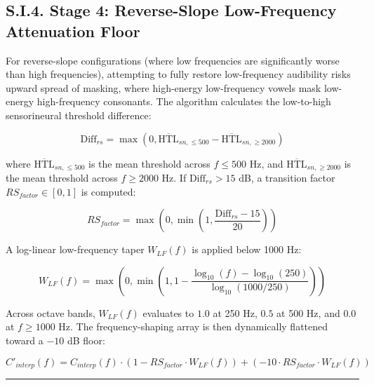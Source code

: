 \documentclass[
  12pt,
]{article}
\begin{document}
\subsection{S.I.4. Stage 4: Reverse-Slope Low-Frequency Attenuation
Floor}\label{s.i.4.-stage-4-reverse-slope-low-frequency-attenuation-floor}

For reverse-slope configurations (where low frequencies are
significantly worse than high frequencies), attempting to fully restore
low-frequency audibility risks upward spread of masking, where
high-energy low-frequency vowels mask low-energy high-frequency
consonants. The algorithm calculates the low-to-high sensorineural
threshold difference:

\begin{equation}
\text{Diff}_{rs} = \max\left(0, \overline{\text{HTL}}_{sn, \le 500} - \overline{\text{HTL}}_{sn, \ge 2000}\right)
\end{equation}

where \(\overline{\text{HTL}}_{sn, \le 500}\) is the mean threshold
across \(f \le 500\) Hz, and \(\overline{\text{HTL}}_{sn, \ge 2000}\) is
the mean threshold across \(f \ge 2000\) Hz. If
\(\text{Diff}_{rs} > 15\) dB, a transition factor
\(RS_{factor} \in [0, 1]\) is computed:

\begin{equation}
RS_{factor} = \max\left(0, \min\left(1, \frac{\text{Diff}_{rs} - 15}{20}\right)\right)
\end{equation}

A log-linear low-frequency taper \(W_{LF}(f)\) is applied below 1000 Hz:

\begin{equation}
W_{LF}(f) = \max\left(0, \min\left(1, 1 - \frac{\log_{10}(f) - \log_{10}(250)}{\log_{10}(1000/250)}\right)\right)
\end{equation}

Across octave bands, \(W_{LF}(f)\) evaluates to \(1.0\) at 250 Hz,
\(0.5\) at 500 Hz, and \(0.0\) at \(f \ge 1000\) Hz. The
frequency-shaping array is then dynamically flattened toward a \(-10\)
dB floor:

\begin{equation}
C'_{interp}(f) = C_{interp}(f) \cdot \left(1 - RS_{factor} \cdot W_{LF}(f)\right) + \left(-10 \cdot RS_{factor} \cdot W_{LF}(f)\right)
\end{equation}

\begin{center}\rule{0.5\linewidth}{0.5pt}\end{center}
\end{document}
